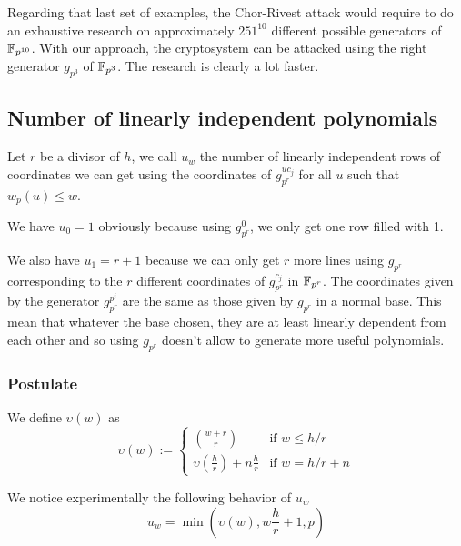 \documentclass[12pt,a4paper,titlepage]{article}
\begin{document}
Regarding that last set of examples, the Chor-Rivest attack would require to do an exhaustive research on approximately $251^{10}$ different possible generators of $\mathbb{F}_{p^{10}}$. With our approach, the cryptosystem can be attacked using the right generator $g_{p^3}$ of $\mathbb{F}_{p^3}$. The research is clearly a lot faster.



\subsection{Number of linearly independent polynomials}

Let $r$ be a divisor of $h$, we call $u_w$ the number of linearly independent rows of coordinates we can get using the coordinates of $g_{p^r}^{uc_j}$ for all $u$ such that $w_p(u) \leq w$.

We have $u_0 = 1$ obviously because using $g_{p^r}^0$, we only get one row filled with 1.

We also have $u_1 = r+1$ because we can only get $r$ more lines using $g_{p^r}$ corresponding to the $r$ different coordinates of $g_{p^r}^{c_j}$ in $\mathbb{F}_{p^r}$. The coordinates given by the generator $g_{p^r}^{p^i}$ are the same as those given by $g_{p^r}$ in a normal base. This mean that whatever the base chosen, they are at least linearly dependent from each other and so using $g_{p^r}$ doesn't allow to generate more useful polynomials.

\subsubsection{Postulate}


%
We define $\upsilon(w)$ as
$$ \upsilon(w) := \begin{cases}
\binom{w+r}{r} & \mbox{if } w \leq h/r \\
\upsilon\left(\frac{h}{r}\right) + n \frac{h}{r} & \mbox{if } w = h/r + n
\end{cases} $$

We notice experimentally the following behavior of $u_w$
$$ u_w = \min \left( \upsilon(w), w\frac{h}{r} + 1 , p \right)$$
\end{document}
